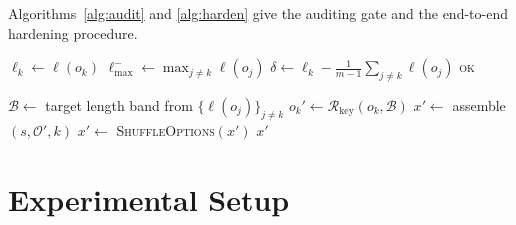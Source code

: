\documentclass[10pt,twocolumn]{article}
\begin{document}
Algorithms~\ref{alg:audit} and \ref{alg:harden} give the auditing gate and the
end-to-end hardening procedure.

\begin{algorithm}[t]
\caption{Length Auditor (detection gate)}
\label{alg:audit}
\DontPrintSemicolon
{}
$\ell_k \leftarrow \ell(o_k)$\;
$\ell_{\max}^{-} \leftarrow \max_{j\neq k}\ell(o_j)$\;
$\delta \leftarrow \ell_k - \frac{1}{m-1}\sum_{j\neq k}\ell(o_j)$\;
\Return \textsc{ok}\;
\end{algorithm}

\begin{algorithm}[t]
\caption{Harden Item (generation-time)}
\label{alg:harden}
\DontPrintSemicolon
{}
$\mathcal{B}\leftarrow$ target length band from $\{\ell(o_j)\}_{j\neq k}$\;
$o_k' \leftarrow \mathcal{R}_{\text{key}}(o_k,\mathcal{B})$\;
$x'\leftarrow$ assemble$(s,\mathcal{O}',k)$\;
$x'\leftarrow$ \textsc{ShuffleOptions}$(x')$\;
\Return $x'$\;
\end{algorithm}

\section{Experimental Setup}
\label{sec:setup}
\end{document}
